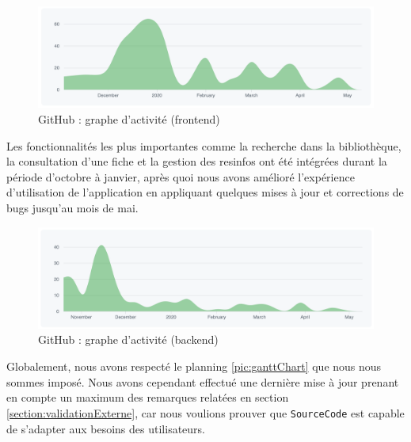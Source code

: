 \begin{figure}[H]
    \includegraphics[width=\textwidth,height=0.3\textheight,keepaspectratio]{images/analyseCritique/graph_frontend.png}
    \centering
    \caption{GitHub : graphe d'activité (frontend)}
    \label{figure:frontendActivity}
\end{figure}

Les fonctionnalités les plus importantes comme la recherche dans la bibliothèque, la consultation d'une \gls{fiche} et la gestion des \glspl{resinfo} ont été intégrées durant la période d'octobre à janvier, après quoi nous avons amélioré l'expérience d'utilisation de l'application en appliquant quelques mises à jour et corrections de bugs jusqu'au mois de mai.\\

\begin{figure}[H]
    \includegraphics[width=\textwidth,height=0.3\textheight,keepaspectratio]{images/analyseCritique/graph_backend.png}
    \centering
    \caption{GitHub : graphe d'activité (backend)}
    \label{figure:backendActivity}
\end{figure}


Globalement, nous avons respecté le planning \ref{pic:ganttChart} que nous nous sommes imposé. Nous avons cependant effectué une dernière mise à jour prenant en compte un maximum des remarques relatées en section \ref{section:validationExterne}, car nous voulions prouver que \texttt{SourceCode} est capable de s'adapter aux besoins des utilisateurs.
